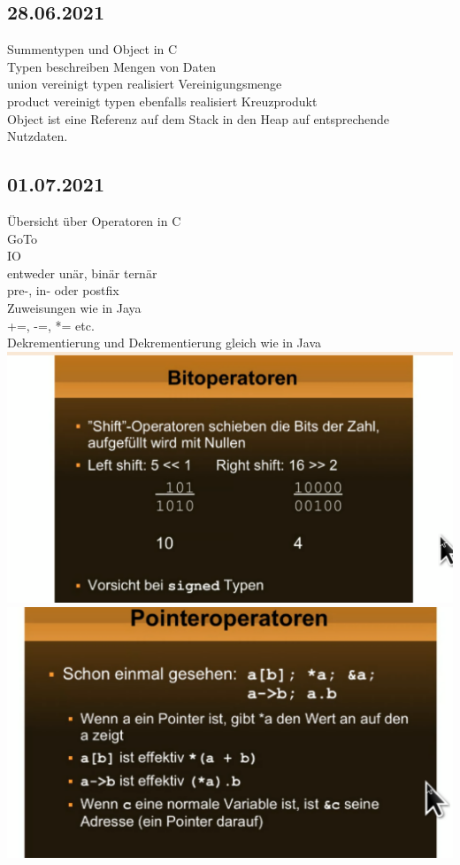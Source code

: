 \documentclass[paper=A4]{article}
\begin{document}
 	\subsection*{28.06.2021}
 	Summentypen und Object in C \\
 	Typen beschreiben Mengen von Daten \\
 	union vereinigt typen realisiert Vereinigungsmenge  \\
 	product vereinigt typen ebenfalls realisiert Kreuzprodukt \\
 	Object ist eine Referenz auf dem Stack in den Heap auf entsprechende Nutzdaten. \\
 	\subsection*{01.07.2021}
 	Übersicht über Operatoren in C \\
 	GoTo \\
 	IO \\
 	entweder unär, binär ternär \\
 	pre-, in- oder postfix \\
 	Zuweisungen wie in Jaya \\
 	+=, -=, *= etc. \\
 	Dekrementierung und Dekrementierung gleich wie in Java \\
 	\includegraphics[width=\linewidth]{bitfly}
 	\\
 	\includegraphics[width=\linewidth]{point} \\
\end{document}
